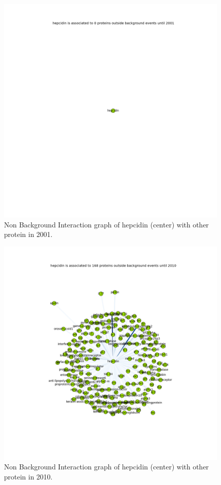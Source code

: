 \documentclass{report} %
\begin{document}
        \begin{figure}[H] 
                \centering
                \includegraphics[width=1.0\textwidth]{images/hepcidinGraphInteractionsNonBackground2001.png}
                \caption{Non Background Interaction graph of hepcidin (center) with other protein in 2001.}
                \label{fig:interact2001NOBK}
        \end{figure}
        \begin{figure}[H] 
                \centering
                \includegraphics[width=1.0\textwidth]{images/hepcidinGraphInteractionsNonBackground2010.png}
                \caption{Non Background Interaction graph of hepcidin (center) with other protein in 2010.}
                \label{fig:interact2010NOBK}
        \end{figure}
\end{document}
